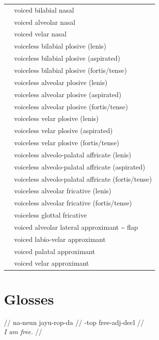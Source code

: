 \documentclass{article}
\begin{document}
\begin{xltabular}{\textwidth}{lL}
   & voiced bilabial nasal \\
   & voiced alveolar nasal \\
   & voiced velar nasal \\
   & voiceless bilabial plosive (lenis) \\
   & voiceless bilabial plosive (aspirated) \\
   & voiceless bilabial plosive (fortis/tense) \\
   & voiceless alveolar plosive (lenis) \\
   & voiceless alveolar plosive (aspirated) \\
   & voiceless alveolar plosive (fortis/tense) \\
   & voiceless velar plosive (lenis) \\
   & voiceless velar plosive (aspirated) \\
   & voiceless velar plosive (fortis/tense) \\
   & voiceless alveolo-palatal affricate (lenis) \\
   & voiceless alveolo-palatal affricate (aspirated) \\
   & voiceless alveolo-palatal affricate (fortis/tense) \\
   & voiceless alveolar fricative (lenis) \\
   & voiceless alveolar fricative (fortis/tense) \\
   & voiceless glottal fricative \\
   & voiced alveolar lateral approximant \textasciitilde{} flap \\
   & voiced labio-velar approximant \\
   & voiced palatal approximant \\
  \ipa{\textturnmrleg} & voiced velar approximant \\
\end{xltabular}

\newpage\section{Glosses}

\ex
\begingl
\gla {}  //
\glb na-neun jayu-rop-da //
-{\sc top} free-{\sc adj}-{\sc decl} //
\\\textit{I am free.} //
\endgl
\xe
\end{document}
